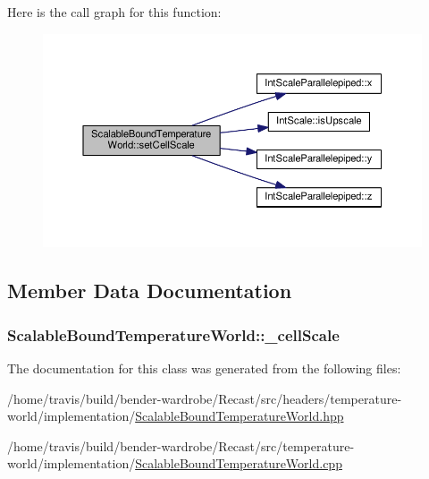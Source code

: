 Here is the call graph for this function\-:
\nopagebreak
\begin{figure}[H]
\begin{center}
\leavevmode
\includegraphics[width=350pt]{class_scalable_bound_temperature_world_addf3187d106391375b4453614a84563b_cgraph}
\end{center}
\end{figure}




\subsection{Member Data Documentation}
\hypertarget{class_scalable_bound_temperature_world_a3ad7a326006a4abbb1c7b64b4bf4d791}{
\subsubsection[{\-\_\-cell\-Scale}]{ Scalable\-Bound\-Temperature\-World\-::\-\_\-cell\-Scale\hspace{0.3cm}{\ttfamily [protected]}}}\label{class_scalable_bound_temperature_world_a3ad7a326006a4abbb1c7b64b4bf4d791}


The documentation for this class was generated from the following files\-:\begin{DoxyCompactItemize}
\item 
/home/travis/build/bender-\/wardrobe/\-Recast/src/headers/temperature-\/world/implementation/\hyperlink{_scalable_bound_temperature_world_8hpp}{Scalable\-Bound\-Temperature\-World.\-hpp}\item 
/home/travis/build/bender-\/wardrobe/\-Recast/src/temperature-\/world/implementation/\hyperlink{_scalable_bound_temperature_world_8cpp}{Scalable\-Bound\-Temperature\-World.\-cpp}\end{DoxyCompactItemize}
